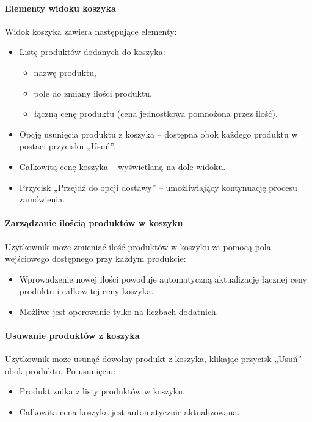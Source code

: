 \documentclass[12pt,a4paper,oneside]{article}
\theoremstyle{definition}
\numberwithin{equation}{section}
\begin{document}
\paragraph{Elementy widoku koszyka}
Widok koszyka zawiera następujące elementy:
\begin{itemize}
    \item Listę produktów dodanych do koszyka:
    \begin{itemize}
        \item nazwę produktu,
        \item pole do zmiany ilości produktu,
        \item łączną cenę produktu (cena jednostkowa pomnożona przez ilość).
    \end{itemize}
    \item Opcję usunięcia produktu z koszyka – dostępna obok każdego produktu w postaci przycisku „Usuń”.
    \item Całkowitą cenę koszyka – wyświetlaną na dole widoku.
    \item Przycisk „Przejdź do opcji dostawy” – umożliwiający kontynuację procesu zamówienia.
\end{itemize}

\paragraph{Zarządzanie ilością produktów w koszyku}
Użytkownik może zmieniać ilość produktów w koszyku za pomocą pola wejściowego dostępnego przy każdym produkcie:
\begin{itemize}
    \item Wprowadzenie nowej ilości powoduje automatyczną aktualizację łącznej ceny produktu i całkowitej ceny koszyka.
    \item Możliwe jest operowanie tylko na liczbach dodatnich.
\end{itemize}

\paragraph{Usuwanie produktów z koszyka}
Użytkownik może usunąć dowolny produkt z koszyka, klikając przycisk „Usuń” obok produktu. Po usunięciu:
\begin{itemize}
    \item Produkt znika z listy produktów w koszyku,
    \item Całkowita cena koszyka jest automatycznie aktualizowana.
\end{itemize}
\end{document}
